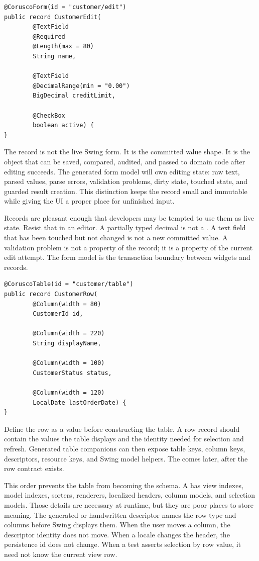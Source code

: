\begin{lstlisting}[caption={The committed edit value.}]
@CoruscoForm(id = "customer/edit")
public record CustomerEdit(
        @TextField
        @Required
        @Length(max = 80)
        String name,

        @TextField
        @DecimalRange(min = "0.00")
        BigDecimal creditLimit,

        @CheckBox
        boolean active) {
}
\end{lstlisting}

The record is not the live Swing form. It is the committed value shape. It is
the object that can be saved, compared, audited, and passed to domain code
after editing succeeds. The generated form model will own editing state: raw
text, parsed values, parse errors, validation problems, dirty state, touched
state, and guarded result creation. This distinction keeps the record small
and immutable while giving the UI a proper place for unfinished input.

Records are pleasant enough that developers may be tempted to use them as live
state. Resist that in an editor. A partially typed decimal is not a
. A text field that has been touched but not changed is not a
new committed value. A validation problem is not a property of the record; it
is a property of the current edit attempt. The form model is the transaction
boundary between widgets and records.

\begin{lstlisting}[caption={The table row value.}]
@CoruscoTable(id = "customer/table")
public record CustomerRow(
        @Column(width = 80)
        CustomerId id,

        @Column(width = 220)
        String displayName,

        @Column(width = 100)
        CustomerStatus status,

        @Column(width = 120)
        LocalDate lastOrderDate) {
}
\end{lstlisting}

Define the row as a value before constructing the table. A row record should
contain the values the table displays and the identity needed for selection
and refresh. Generated table companions can then expose table keys, column
keys, descriptors, resource keys, and Swing model helpers. The 
comes later, after the row contract exists.

This order prevents the table from becoming the schema. A  has
view indexes, model indexes, sorters, renderers, localized headers, column
models, and selection models. Those details are necessary at runtime, but they
are poor places to store meaning. The generated or handwritten descriptor
names the row type and columns before Swing displays them. When the user moves
a column, the descriptor identity does not move. When a locale changes the
header, the persistence id does not change. When a test asserts selection by
row value, it need not know the current view row.

